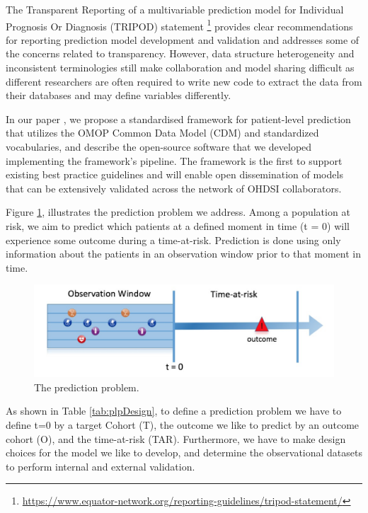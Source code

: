 \documentclass[11pt]{book}
\let\rmarkdownfootnote\footnote%
\def\footnote{\protect\rmarkdownfootnote}
\begin{document}
The Transparent Reporting of a multivariable prediction model for
Individual Prognosis Or Diagnosis (TRIPOD) statement \footnote{\url{https://www.equator-network.org/reporting-guidelines/tripod-statement/}}
provides clear recommendations for reporting prediction model
development and validation and addresses some of the concerns related to
transparency. However, data structure heterogeneity and inconsistent
terminologies still make collaboration and model sharing difficult as
different researchers are often required to write new code to extract
the data from their databases and may define variables differently.

In our paper \citep{reps2018}, we propose a standardised framework for
patient-level prediction that utilizes the OMOP Common Data Model (CDM)
and standardized vocabularies, and describe the open-source software
that we developed implementing the framework's pipeline. The framework
is the first to support existing best practice guidelines and will
enable open dissemination of models that can be extensively validated
across the network of OHDSI collaborators.

Figure \ref{fig:figure1}, illustrates the prediction problem we address.
Among a population at risk, we aim to predict which patients at a
defined moment in time (t = 0) will experience some outcome during a
time-at-risk. Prediction is done using only information about the
patients in an observation window prior to that moment in time.

\begin{figure}
\includegraphics[width=1\linewidth]{images/PatientLevelPrediction/Figure1} \caption{The prediction problem.}\label{fig:figure1}
\end{figure}

As shown in Table \ref{tab:plpDesign}, to define a prediction problem we
have to define t=0 by a target Cohort (T), the outcome we like to
predict by an outcome cohort (O), and the time-at-risk (TAR).
Furthermore, we have to make design choices for the model we like to
develop, and determine the observational datasets to perform internal
and external validation.
\end{document}
